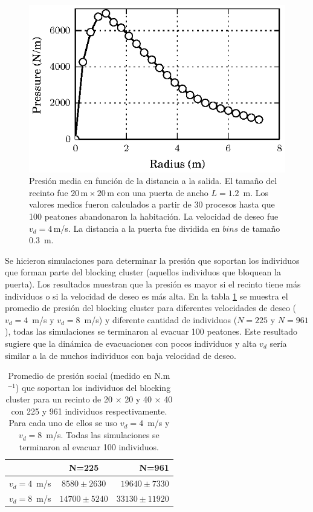 \begin{figure}[H]
    \centering
    \includegraphics[scale=1.6]{figuras/p_dist.eps}
    \caption[width=5cm]{Presión media en función de la distancia a la salida. El tamaño del recinto fue $20\,\mathrm{m}\times20\,\mathrm{m}$  con una puerta de ancho $L=1.2$~m. Los valores medios fueron calculados a partir de 30 procesos hasta que 100 peatones abandonaron la habitación. La velocidad de deseo fue $v_d=4\,$m/s. La distancia a la puerta fue dividida en $bins$ de tamaño $0.3$~m.}
    \label{p_dist}
\end{figure}

Se hicieron simulaciones para determinar la presión que soportan los individuos que forman parte del blocking cluster (aquellos individuos que bloquean la puerta). Los resultados muestran que la presión es mayor si el recinto tiene más individuos o si la velocidad de deseo es más alta. En la tabla \ref{tabla_p}  se muestra el promedio de presión del blocking cluster para diferentes velocidades de deseo ($v_d=4$~m/s y $v_d=8$~m/s) y diferente cantidad de individuos ($N=225$ y $N=961$), todas las simulaciones se terminaron al evacuar 100 peatones. Este resultado sugiere que la dinámica de evacuaciones con pocos individuos y alta $v_d$ sería similar a la de muchos individuos con baja velocidad de deseo.

\begin{table}[H]
\begin{center}
   \begin{tabular}{| l | c | r | }
     \hline
      & N=225 & N=961 \\ \hline
     $v_d = 4$~m/s & $8580 \pm 2630$   & $19640 \pm 7330$ \\ \hline
     $v_d = 8$~m/s & $14700 \pm 5240$  & $33130 \pm 11920$  \\
     \hline
   \end{tabular}
 \end{center}
   \caption[width=5cm]{Promedio de presión social (medido en N.m$^{-1}$) que soportan los individuos del blocking cluster para un recinto de 20 $\times$ 20 y 40 $\times$ 40 con 225 y 961 individuos respectivamente. Para cada uno de ellos se uso $v_d=4$~m/s y $v_d=8$~m/s. Todas las simulaciones se terminaron al evacuar 100 individuos.}
   \label{tabla_p}
   \end{table}   
   

